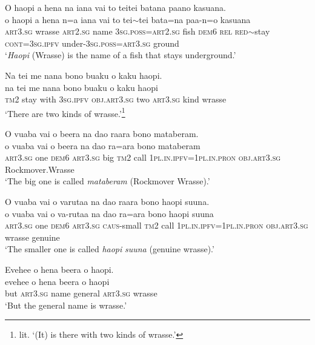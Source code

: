 \ea\label{ex:text28-1}
O haopi a hena na iana vai to teitei batana paano kasuana.\\
\gll o	haopi	a	hena	n=a	iana	vai	to	tei{$\sim$}tei	bata=na	paa-n=o	kasuana\\
     \textsc{art}3.\textsc{sg}	wrasse	\textsc{art}2.\textsc{sg}	name	3\textsc{sg}.\textsc{poss}=\textsc{art}2.\textsc{sg}	fish	\textsc{dem}6	\textsc{rel}	\textsc{red}{$\sim$}stay	\textsc{cont}=3\textsc{sg}.\textsc{ipfv}	under-3\textsc{sg}.\textsc{poss}=\textsc{art}3.\textsc{sg}	ground\\
\glt `\textit{Haopi} (Wrasse) is the name of a fish that stays underground.'
\z

\ea\label{ex:text28-2}
Na tei me nana bono buaku o kaku haopi.\\
\gll na	tei	me	nana	bono	buaku	o	kaku	haopi\\
     \textsc{tm}2	stay	with	3\textsc{sg}.\textsc{ipfv}	\textsc{obj}.\textsc{art}3.\textsc{sg}	two	\textsc{art}3.\textsc{sg}	kind	wrasse\\
\glt `There are two kinds of wrasse.'\footnote{lit. `(It) is there with two kinds of wrasse.'}
\z

\ea\label{ex:text28-3}
O vuaba vai o beera na dao raara bono mataberam.\\
\gll o	vuaba	vai	o	beera	na	dao	ra=ara	bono	mataberam\\
     \textsc{art}3.\textsc{sg}	one	\textsc{dem}6	\textsc{art}3.\textsc{sg}	big	\textsc{tm}2	call	1\textsc{pl}.\textsc{in}.\textsc{ipfv}=1\textsc{pl}.\textsc{in}.\textsc{pron}	\textsc{obj}.\textsc{art}3.\textsc{sg}	Rockmover.Wrasse\\
\glt `The big one is called \textit{mataberam} (Rockmover Wrasse).'
\z

\ea\label{ex:text28-4}
O vuaba vai o varutaa na dao raara bono haopi suuna.\\
\gll o	vuaba	vai	o	va-rutaa	na	dao	ra=ara	bono	haopi	suuna\\
     \textsc{art}3.\textsc{sg}	one	\textsc{dem}6	\textsc{art}3.\textsc{sg}	\textsc{caus}-small	\textsc{tm}2	call	1\textsc{pl}.\textsc{in}.\textsc{ipfv}=1\textsc{pl}.\textsc{in}.\textsc{pron}	\textsc{obj}.\textsc{art}3.\textsc{sg}	wrasse	genuine\\
\glt `The smaller one is called \textit{haopi} \textit{suuna} (genuine wrasse).'
\z

\ea\label{ex:text28-5}
Evehee o hena beera o haopi.\\
\gll evehee	o	hena	beera	o	haopi\\
     but	\textsc{art}3.\textsc{sg}	name	general	\textsc{art}3.\textsc{sg}	wrasse\\
\glt `But the general name is wrasse.'
\z

